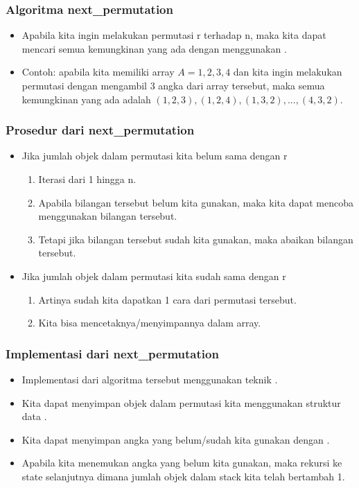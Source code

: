 \begin{frame}
\frametitle{Algoritma next\_permutation}
\begin{itemize}
  \item Apabila kita ingin melakukan permutasi r terhadap n, maka kita dapat mencari semua kemungkinan yang ada dengan menggunakan .
  \item Contoh: apabila kita memiliki array $A={1,2,3,4}$ dan kita ingin melakukan permutasi dengan mengambil 3 angka dari array tersebut, maka semua kemungkinan yang ada adalah $(1,2,3), (1,2,4), (1,3,2), ..., (4,3,2)$.
\end{itemize}
\end{frame}

\begin{frame}
\frametitle{Prosedur dari next\_permutation}
\begin{itemize}
  \item Jika jumlah objek dalam permutasi kita belum sama dengan r
  \begin{enumerate}
    \item Iterasi dari 1 hingga n.
    \item Apabila bilangan tersebut belum kita gunakan, maka kita dapat mencoba menggunakan bilangan tersebut.
    \item Tetapi jika bilangan tersebut sudah kita gunakan, maka abaikan bilangan tersebut.
  \end{enumerate}
  \item Jika jumlah objek dalam permutasi kita sudah sama dengan r
  \begin{enumerate}
    \item Artinya sudah kita dapatkan 1 cara dari permutasi tersebut.
    \item Kita bisa mencetaknya/menyimpannya dalam array.
  \end{enumerate}
\end{itemize}
\end{frame}

\begin{frame}
\frametitle{Implementasi dari next\_permutation}
\begin{itemize}
  \item Implementasi dari algoritma tersebut menggunakan teknik .
  \item Kita dapat menyimpan objek dalam permutasi kita menggunakan struktur data .
  \item Kita dapat menyimpan angka yang belum/sudah kita gunakan dengan .
  \item Apabila kita menemukan angka yang belum kita gunakan, maka rekursi ke state selanjutnya dimana jumlah objek dalam stack kita telah bertambah 1.
\end{itemize}
\end{frame}

